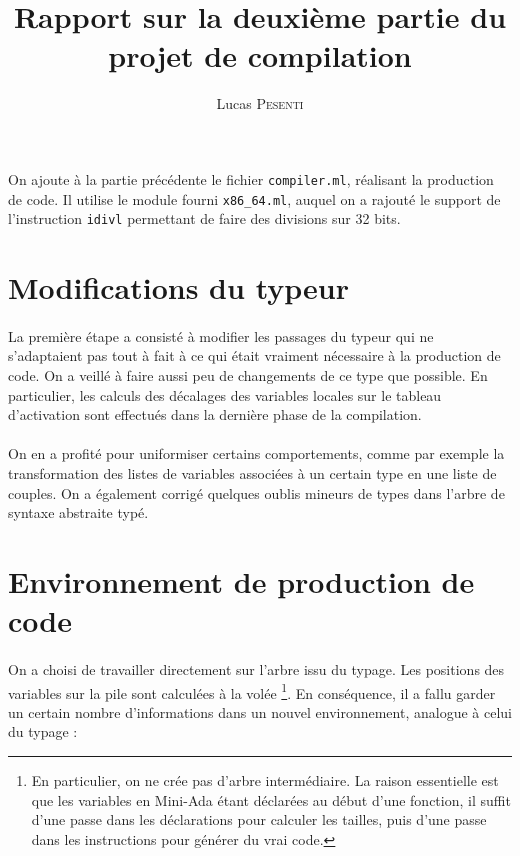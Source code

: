 \documentclass[a4paper,12pt]{article}
\title{Rapport sur la deuxième partie du projet de compilation}
\author{Lucas \textsc{Pesenti}}
\date{}
\begin{document}
\maketitle
\paragraph*{}
On ajoute à la partie précédente le fichier \texttt{compiler.ml}, réalisant la production de code. Il utilise le module fourni \texttt{x86\_64.ml}, auquel on
a rajouté le support de l'instruction \texttt{idivl} permettant de faire des divisions sur 32 bits.

\section{Modifications du typeur}

\paragraph*{}
La première étape a consisté à modifier les passages du typeur qui ne s'adaptaient pas tout à fait à ce qui était vraiment
nécessaire à la production de code. On a veillé à faire aussi peu de changements de ce type que possible. En particulier,
les calculs des décalages des variables locales sur le tableau d'activation sont effectués dans la dernière phase de la
compilation.

\paragraph*{}
On en a profité pour uniformiser certains comportements, comme par exemple la transformation des listes de variables associées
à un certain type en une liste de couples. On a également corrigé quelques oublis mineurs de types dans l'arbre de syntaxe
abstraite typé.

\section{Environnement de production de code}

\paragraph*{}
On a choisi de travailler directement sur l'arbre issu du typage. Les positions des variables sur la pile sont calculées à la
volée \footnote{En particulier, on ne crée pas d'arbre intermédiaire. La raison essentielle est que les variables en Mini-Ada étant
déclarées au début d'une fonction, il suffit d'une passe dans les déclarations pour calculer les tailles, puis d'une passe dans
les instructions pour générer du vrai code.}. En conséquence, il a fallu garder un certain nombre d'informations dans un
nouvel environnement, analogue à celui du typage :
\end{document}
